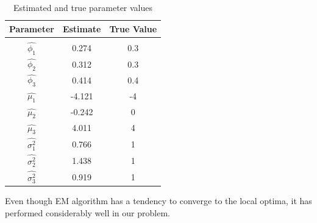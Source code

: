 \documentclass[11pt, a4paper]{article}\usepackage[]{graphicx}\usepackage[]{xcolor}
\begin{document}
\begin{table}[!htbp]
\def\arraystretch{1.5}

\centering
\begin{tabular}{ccc}
\hline
Parameter & Estimate & True Value \\[0.5em]
\hline \\[-0.8em]

$\widehat{\phi_1}$ 
& 0.274 
& 0.3 \\[1em]

$\widehat{\phi_2}$ 
& 0.312 
& 0.3 \\[1em]

$\widehat{\phi_3}$ 
& 0.414 
& 0.4 \\[1em]

$\widehat{\mu_1}$ 
& -4.121 
& -4 \\[1em]

$\widehat{\mu_2}$ 
& -0.242 
& 0 \\[1em]

$\widehat{\mu_3}$ 
& 4.011 
& 4 \\[1em]

$\widehat{\sigma_1^2}$ 
& 0.766 
& 1 \\[1em]

$\widehat{\sigma_2^2}$ 
& 1.438 
& 1 \\[0.5em]

$\widehat{\sigma_3^2}$ 
& 0.919 
& 1 \\[1em]
\hline
\end{tabular}
\caption{Estimated and true parameter values}
\end{table}

\vspace{1cm}

{\fontsize{25}{20} } \hspace{0.1cm} {\fontsize{12}{20}\gloriahallelujahfont Even though EM algorithm has a tendency to converge to the local optima, it has performed considerably well in our problem.}
\end{document}
